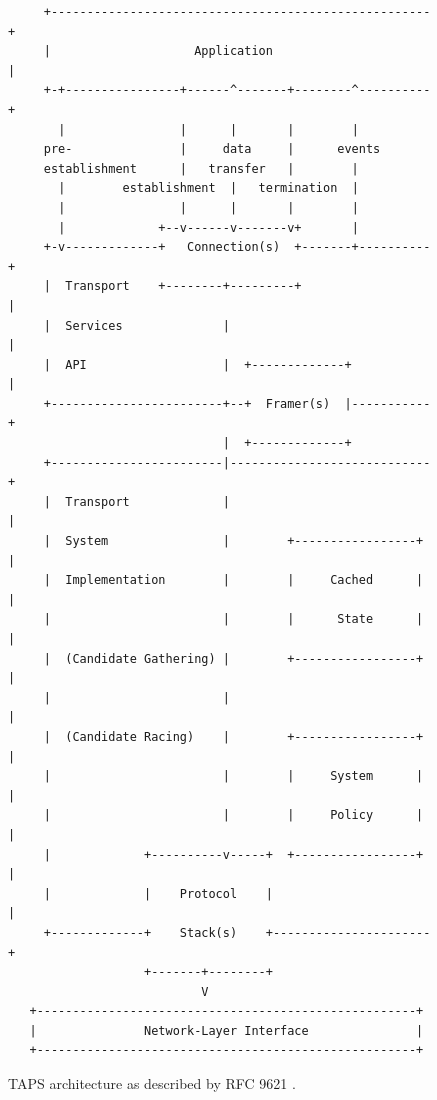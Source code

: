 \begin{figure}[p]
    \centering
    \begin{lstlisting}
     +-----------------------------------------------------+
     |                    Application                      |
     +-+----------------+------^-------+--------^----------+
       |                |      |       |        |
     pre-               |     data     |      events
     establishment      |   transfer   |        |
       |        establishment  |   termination  |
       |                |      |       |        |
       |             +--v------v-------v+       |
     +-v-------------+   Connection(s)  +-------+----------+
     |  Transport    +--------+---------+                  |
     |  Services              |                            |
     |  API                   |  +-------------+           |
     +------------------------+--+  Framer(s)  |-----------+
                              |  +-------------+
     +------------------------|----------------------------+
     |  Transport             |                            |
     |  System                |        +-----------------+ |
     |  Implementation        |        |     Cached      | |
     |                        |        |      State      | |
     |  (Candidate Gathering) |        +-----------------+ |
     |                        |                            |
     |  (Candidate Racing)    |        +-----------------+ |
     |                        |        |     System      | |
     |                        |        |     Policy      | |
     |             +----------v-----+  +-----------------+ |
     |             |    Protocol    |                      |
     +-------------+    Stack(s)    +----------------------+
                   +-------+--------+
                           V
   +-----------------------------------------------------+
   |               Network-Layer Interface               |
   +-----------------------------------------------------+
    \end{lstlisting}
    \caption{TAPS architecture as described by RFC 9621 \cite{paulyArchitectureRequirementsTransport2025}.}
    \label{fig:tapsArch}
\end{figure}

